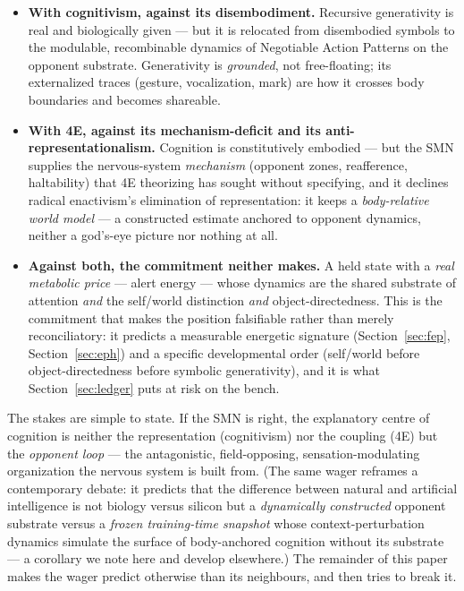 \documentclass[utf8]{FrontiersinHarvard} %
\begin{document}
\begin{itemize}
\item \textbf{With cognitivism, against its disembodiment.} Recursive generativity is real and biologically given --- but it is relocated from disembodied symbols to the modulable, recombinable dynamics of Negotiable Action Patterns on the opponent substrate. Generativity is \emph{grounded}, not free-floating; its externalized traces (gesture, vocalization, mark) are how it crosses body boundaries and becomes shareable.
\item \textbf{With 4E, against its mechanism-deficit and its anti-representationalism.} Cognition is constitutively embodied --- but the SMN supplies the nervous-system \emph{mechanism} (opponent zones, reafference, haltability) that 4E theorizing has sought without specifying, and it declines radical enactivism's elimination of representation: it keeps a \emph{body-relative world model} --- a constructed estimate anchored to opponent dynamics, neither a god's-eye picture nor nothing at all.
\item \textbf{Against both, the commitment neither makes.} A held state with a \emph{real metabolic price} --- alert energy --- whose dynamics are the shared substrate of attention \emph{and} the self/world distinction \emph{and} object-directedness. This is the commitment that makes the position falsifiable rather than merely reconciliatory: it predicts a measurable energetic signature (Section~\ref{sec:fep}, Section~\ref{sec:eph}) and a specific developmental order (self/world before object-directedness before symbolic generativity), and it is what Section~\ref{sec:ledger} puts at risk on the bench.
\end{itemize}

The stakes are simple to state. If the SMN is right, the explanatory centre of cognition is neither the representation (cognitivism) nor the coupling (4E) but the \emph{opponent loop} --- the antagonistic, field-opposing, sensation-modulating organization the nervous system is built from. (The same wager reframes a contemporary debate: it predicts that the difference between natural and artificial intelligence is not biology versus silicon but a \emph{dynamically constructed} opponent substrate versus a \emph{frozen training-time snapshot} whose context-perturbation dynamics simulate the surface of body-anchored cognition without its substrate --- a corollary we note here and develop elsewhere.) The remainder of this paper makes the wager predict otherwise than its neighbours, and then tries to break it.
\end{document}
